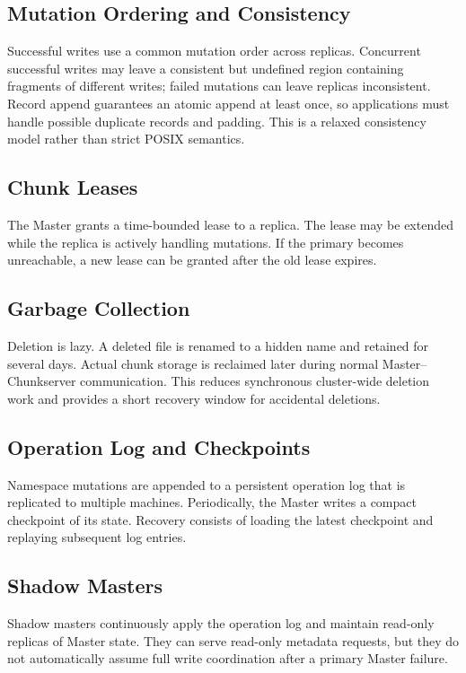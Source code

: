 \documentclass[11pt,a4paper,oneside]{book}
\begin{document}
\subsection{Mutation Ordering and Consistency}

Successful writes use a common mutation order across replicas. Concurrent successful writes may leave a consistent but undefined region containing fragments of different writes; failed mutations can leave replicas inconsistent. Record append guarantees an atomic append at least once, so applications must handle possible duplicate records and padding. This is a relaxed consistency model rather than strict POSIX semantics.

\subsection{Chunk Leases}

The Master grants a time-bounded lease to a replica. The lease may be extended while the replica is actively handling mutations. If the primary becomes unreachable, a new lease can be granted after the old lease expires.

\subsection{Garbage Collection}

Deletion is lazy. A deleted file is renamed to a hidden name and retained for several days. Actual chunk storage is reclaimed later during normal Master--Chunkserver communication. This reduces synchronous cluster-wide deletion work and provides a short recovery window for accidental deletions.

\subsection{Operation Log and Checkpoints}

Namespace mutations are appended to a persistent operation log that is replicated to multiple machines. Periodically, the Master writes a compact checkpoint of its state. Recovery consists of loading the latest checkpoint and replaying subsequent log entries.

\subsection{Shadow Masters}

Shadow masters continuously apply the operation log and maintain read-only replicas of Master state. They can serve read-only metadata requests, but they do not automatically assume full write coordination after a primary Master failure.
\end{document}
